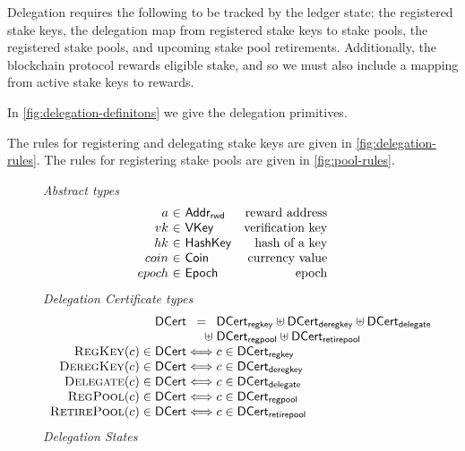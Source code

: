 \documentclass[11pt,a4paper]{article}
\newcommand{\uniondistinct}{\uplus}
\newcommand{\type}[1]{\mathsf{#1}}
\newcommand{\AddrRWD}{\type{Addr_{rwd}}}
\newcommand{\VKey}{\type{VKey}}
\newcommand{\HashKey}{\type{HashKey}}
\newcommand{\Coin}{\type{Coin}}
\newcommand{\Epoch}{\type{Epoch}}
\newcommand{\DCert}{\type{DCert}}
\newcommand{\DCertRegKey}{\type{DCert_{regkey}}}
\newcommand{\DCertDeRegKey}{\type{DCert_{deregkey}}}
\newcommand{\DCertDeleg}{\type{DCert_{delegate}}}
\newcommand{\DCertRegPool}{\type{DCert_{regpool}}}
\newcommand{\DCertRetirePool}{\type{DCert_{retirepool}}}
\newcommand{\RegKey}[1]{\textsc{RegKey}(#1)}
\newcommand{\DeregKey}[1]{\textsc{DeregKey}(#1)}
\newcommand{\Delegate}[1]{\textsc{Delegate}(#1)}
\newcommand{\RegPool}[1]{\textsc{RegPool}(#1)}
\newcommand{\RetirePool}[1]{\textsc{RetirePool}(#1)}
\begin{document}
Delegation requires the following to be tracked by the ledger state:
the registered stake keys, the delegation map from registered stake keys to stake
pools, the registered stake pools, and upcoming stake pool retirements.
Additionally, the blockchain protocol rewards eligible stake, and so we must
also include a mapping from active stake keys to rewards.

In \cref{fig:delegation-definitons} we give the delegation primitives.

The rules for registering and delegating stake keys are given in \cref{fig:delegation-rules}.
The rules for registering stake pools are given in \cref{fig:pool-rules}.

\begin{figure}
  \emph{Abstract types}
  \begin{equation*}
    \begin{array}{r@{~\in~}lr}
      a & \AddrRWD & \text{reward address} \\
      vk & \VKey & \text{verification key} \\
      hk & \HashKey & \text{hash of a key} \\
      coin & \Coin & \text{currency value} \\
      epoch & \Epoch & \text{epoch}
    \end{array}
  \end{equation*}
  \emph{Delegation Certificate types}
  \begin{equation*}
  \begin{array}{r@{}c@{}l}
    \DCert &=& \DCertRegKey \uniondistinct \DCertDeRegKey \uniondistinct \DCertDeleg \\
                &\hfill\uniondistinct\;& \DCertRegPool \uniondistinct \DCertRetirePool \\
    \RegKey{c} \in \DCert &\iff& c \in \DCertRegKey \\
    \DeregKey{c} \in \DCert &\iff& c \in \DCertDeRegKey \\
    \Delegate{c} \in \DCert &\iff& c \in \DCertDeleg \\
    \RegPool{c} \in \DCert &\iff& c \in \DCertRegPool\\
    \RetirePool{c} \in \DCert &\iff& c \in \DCertRetirePool \\
  \end{array}
  \end{equation*}
  \emph{Delegation States}
  \begin{equation*}
    \begin{array}{l}

\end{array}
\end{equation*}
\end{figure}
\end{document}
